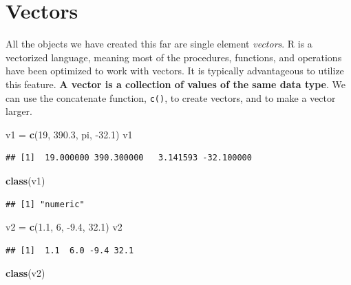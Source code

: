 \documentclass[
]{book}
\newenvironment{Shaded}{\begin{snugshade}}{\end{snugshade}}
\newcommand{\DecValTok}[1]{\textcolor[rgb]{0.00,0.00,0.81}{#1}}
\newcommand{\FloatTok}[1]{\textcolor[rgb]{0.00,0.00,0.81}{#1}}
\newcommand{\KeywordTok}[1]{\textcolor[rgb]{0.13,0.29,0.53}{\textbf{#1}}}
\newcommand{\NormalTok}[1]{#1}
\newcommand{\StringTok}[1]{\textcolor[rgb]{0.31,0.60,0.02}{#1}}
\begin{document}
\hypertarget{vectors}{%
\section{Vectors}\label{vectors}}

All the objects we have created this far are single element \emph{vectors}. R is a vectorized language, meaning most of the procedures, functions, and operations have been optimized to work with vectors. It is typically advantageous to utilize this feature. \textbf{A vector is a collection of values of the same data type}. We can use the concatenate function, \texttt{c()}, to create vectors, and to make a vector larger.

\begin{Shaded}
\begin{Highlighting}[]
\NormalTok{v1 =}\StringTok{ }\KeywordTok{c}\NormalTok{(}\DecValTok{19}\NormalTok{, }\FloatTok{390.3}\NormalTok{, pi, }\FloatTok{-32.1}\NormalTok{)}
\NormalTok{v1}
\end{Highlighting}
\end{Shaded}

\begin{verbatim}
## [1]  19.000000 390.300000   3.141593 -32.100000
\end{verbatim}

\begin{Shaded}
\begin{Highlighting}[]
\KeywordTok{class}\NormalTok{(v1)}
\end{Highlighting}
\end{Shaded}

\begin{verbatim}
## [1] "numeric"
\end{verbatim}

\begin{Shaded}
\begin{Highlighting}[]
\NormalTok{v2 =}\StringTok{ }\KeywordTok{c}\NormalTok{(}\FloatTok{1.1}\NormalTok{, }\DecValTok{6}\NormalTok{, }\FloatTok{-9.4}\NormalTok{, }\FloatTok{32.1}\NormalTok{)}
\NormalTok{v2}
\end{Highlighting}
\end{Shaded}

\begin{verbatim}
## [1]  1.1  6.0 -9.4 32.1
\end{verbatim}

\begin{Shaded}
\begin{Highlighting}[]
\KeywordTok{class}\NormalTok{(v2)}
\end{Highlighting}
\end{Shaded}
\end{document}
